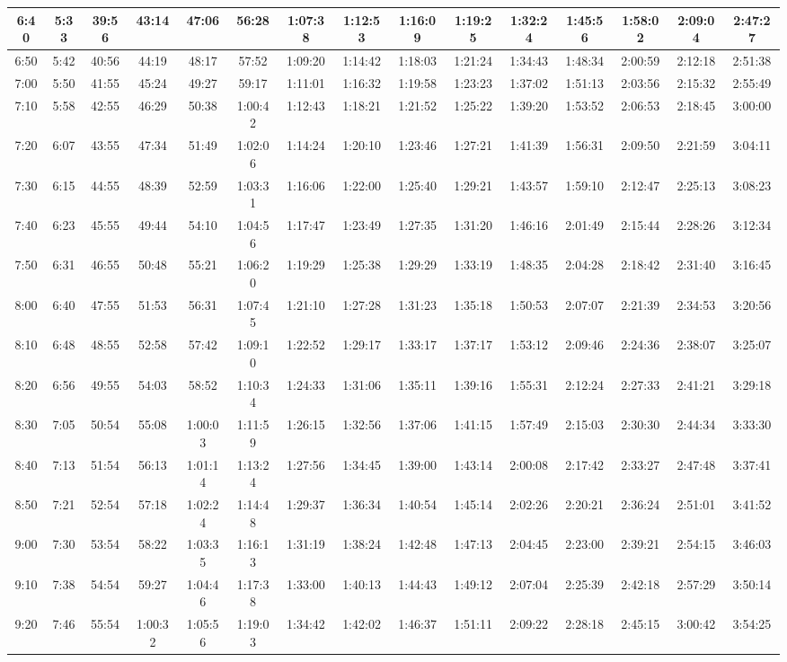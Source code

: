 \begin{scriptsize}
\begin{tabular}{c | c | c | c | c | c | c | c | c | c | c | c | c | c | c}
		6:40&5:33&39:56&43:14&47:06&56:28&1:07:38&1:12:53&1:16:09&1:19:25&1:32:24&1:45:56&1:58:02&2:09:04&2:47:27\\\hline
		6:50&5:42&40:56&44:19&48:17&57:52&1:09:20&1:14:42&1:18:03&1:21:24&1:34:43&1:48:34&2:00:59&2:12:18&2:51:38\\\hline
		7:00&5:50&41:55&45:24&49:27&59:17&1:11:01&1:16:32&1:19:58&1:23:23&1:37:02&1:51:13&2:03:56&2:15:32&2:55:49\\\hline
		7:10&5:58&42:55&46:29&50:38&1:00:42&1:12:43&1:18:21&1:21:52&1:25:22&1:39:20&1:53:52&2:06:53&2:18:45&3:00:00\\\hline
		7:20&6:07&43:55&47:34&51:49&1:02:06&1:14:24&1:20:10&1:23:46&1:27:21&1:41:39&1:56:31&2:09:50&2:21:59&3:04:11\\\hline
		7:30&6:15&44:55&48:39&52:59&1:03:31&1:16:06&1:22:00&1:25:40&1:29:21&1:43:57&1:59:10&2:12:47&2:25:13&3:08:23\\\hline
		7:40&6:23&45:55&49:44&54:10&1:04:56&1:17:47&1:23:49&1:27:35&1:31:20&1:46:16&2:01:49&2:15:44&2:28:26&3:12:34\\\hline
		7:50&6:31&46:55&50:48&55:21&1:06:20&1:19:29&1:25:38&1:29:29&1:33:19&1:48:35&2:04:28&2:18:42&2:31:40&3:16:45\\\hline
		8:00&6:40&47:55&51:53&56:31&1:07:45&1:21:10&1:27:28&1:31:23&1:35:18&1:50:53&2:07:07&2:21:39&2:34:53&3:20:56\\\hline
		8:10&6:48&48:55&52:58&57:42&1:09:10&1:22:52&1:29:17&1:33:17&1:37:17&1:53:12&2:09:46&2:24:36&2:38:07&3:25:07\\\hline
		8:20&6:56&49:55&54:03&58:52&1:10:34&1:24:33&1:31:06&1:35:11&1:39:16&1:55:31&2:12:24&2:27:33&2:41:21&3:29:18\\\hline
		8:30&7:05&50:54&55:08&1:00:03&1:11:59&1:26:15&1:32:56&1:37:06&1:41:15&1:57:49&2:15:03&2:30:30&2:44:34&3:33:30\\\hline
		8:40&7:13&51:54&56:13&1:01:14&1:13:24&1:27:56&1:34:45&1:39:00&1:43:14&2:00:08&2:17:42&2:33:27&2:47:48&3:37:41\\\hline
		8:50&7:21&52:54&57:18&1:02:24&1:14:48&1:29:37&1:36:34&1:40:54&1:45:14&2:02:26&2:20:21&2:36:24&2:51:01&3:41:52\\\hline
		9:00&7:30&53:54&58:22&1:03:35&1:16:13&1:31:19&1:38:24&1:42:48&1:47:13&2:04:45&2:23:00&2:39:21&2:54:15&3:46:03\\\hline
		9:10&7:38&54:54&59:27&1:04:46&1:17:38&1:33:00&1:40:13&1:44:43&1:49:12&2:07:04&2:25:39&2:42:18&2:57:29&3:50:14\\\hline
		9:20&7:46&55:54&1:00:32&1:05:56&1:19:03&1:34:42&1:42:02&1:46:37&1:51:11&2:09:22&2:28:18&2:45:15&3:00:42&3:54:25\\\hline

\end{tabular}
\end{scriptsize}
